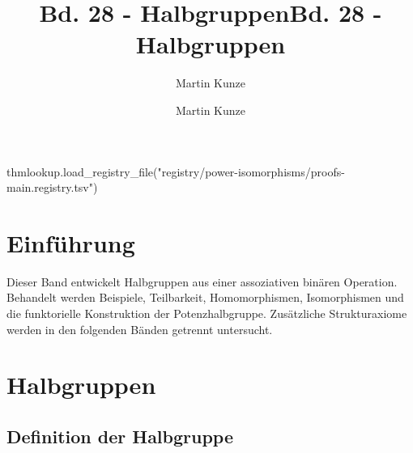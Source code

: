 \documentclass[main.tex]{subfiles}
\title{Bd. 28 - Halbgruppen}
\author{Martin Kunze}
\date{}
\begin{document}
\begin{luacode*}
  thmlookup.load_registry_file("registry/power-isomorphisms/proofs-main.registry.tsv")
\end{luacode*}

\ProofWideReasonsNearFormula

\title{Bd. 28 - Halbgruppen}
\author{Martin Kunze}
\date{}
\hypersetup{pageanchor=false}
\maketitle
\hypersetup{pageanchor=true}
\setcounter{tocdepth}{3}
\tableofcontents
\setcounter{file}{28}
\renewcommand{\FormulaBandID}{28}




\chapter{Einführung}

Dieser Band entwickelt Halbgruppen aus einer assoziativen binären Operation.
Behandelt werden Beispiele, Teilbarkeit, Homomorphismen, Isomorphismen und
die funktorielle Konstruktion der Potenzhalbgruppe. Zusätzliche
Strukturaxiome werden in den folgenden Bänden getrennt untersucht.

\chapter{Halbgruppen}

\section{Definition der Halbgruppe}


\end{document}
